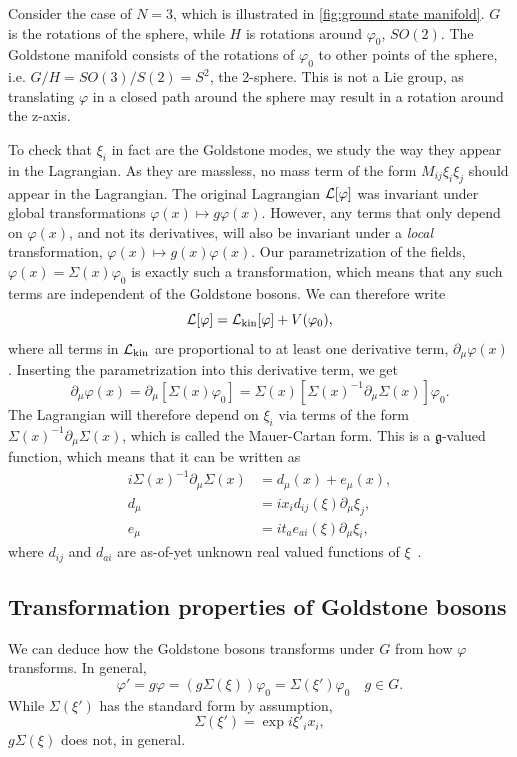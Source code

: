 Consider the case of $N = 3$, which is illustrated in \autoref{fig:ground state manifold}.
$G$ is the rotations of the sphere, while $H$ is rotations around $\varphi_0$, $SO(2)$.
The Goldstone manifold consists of the rotations of $\varphi_0$ to other points of the sphere, i.e. $G/H = SO(3)/S(2) = S^2$, the 2-sphere.
This is not a Lie group, as translating $\varphi$ in a closed path around the sphere may result in a rotation around the z-axis.


To check that $\xi_i$ in fact are the Goldstone modes, we study the way they appear in the Lagrangian.
As they are massless, no mass term of the form $M_{ij} \xi_i \xi_j$ should appear in the Lagrangian.
The original Lagrangian $\mathcal{L}[\varphi]$ was invariant under global transformations $\varphi(x) \mapsto g \varphi(x)$.
However, any terms that only depend on $\varphi(x)$, and not its derivatives, will also be invariant under a \emph{local} transformation, $\varphi(x) \mapsto g(x)\varphi(x)$.
Our parametrization of the fields, $\varphi(x) = \Sigma(x)\varphi_0$ is exactly such a transformation, which means that any such terms are independent of the Goldstone bosons.
We can therefore write
\begin{equation}
    \mathcal{L}[\varphi] = \mathcal{L}_{\mathrm{kin}}[\varphi] + V(\varphi_0),
\end{equation}
where all terms in $\mathcal{L}_{\mathrm{kin}}$ are proportional to at least one derivative term, $\partial_\mu \varphi(x)$.
Inserting the parametrization into this derivative term, we get
\begin{equation}
    \partial_\mu \varphi(x) = \partial_\mu [\Sigma(x) \varphi_0]
    = \Sigma(x) [\Sigma(x)^{-1} \partial_{\mu} \Sigma(x)] \varphi_0.
\end{equation}
The Lagrangian will therefore depend on $\xi_i$ via terms of the form $\Sigma(x)^{-1}\partial_\mu \Sigma(x)$, which is called the Mauer-Cartan form.
This is a $\mathfrak g$-valued function, which means that it can be written as
\begin{align*}
    i\Sigma(x)^{-1}\partial_\mu \Sigma(x) & 
    = d_{\mu}(x) + e_{\mu}(x), \\
    d_{\mu} & = i x_i d_{ij}(\xi) \partial_\mu \xi_j, \\
    e_{\mu} & = i t_a e_{ai}(\xi)\partial_\mu \xi_i,
\end{align*}
where $d_{ij}$ and $d_{ai}$ are as-of-yet unknown real valued functions of $\xi$~\cite{weinberg_1996_vol2,Watanabe:effective_lagrangian}.

\subsection*{Transformation properties of Goldstone bosons}
We can deduce how the Goldstone bosons transforms under $G$ from how $\varphi$ transforms.
In general, 
\begin{equation}
    \varphi' = g \varphi = (g \Sigma(\xi)) \varphi_0 = \Sigma(\xi') \varphi_0 \quad g \in G.
\end{equation}
While $\Sigma(\xi')$ has the standard form by assumption,
\begin{equation}
    \Sigma(\xi') = \exp{i \xi'_i x_i},
\end{equation}
$g\Sigma(\xi)$ does not, in general.

